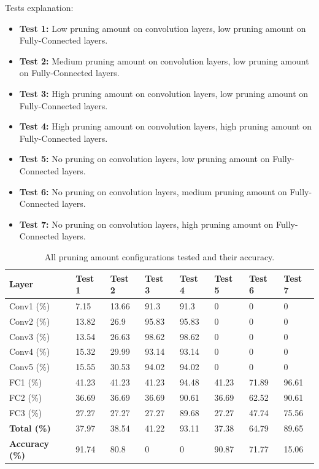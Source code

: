 Tests explanation:
\begin{itemize}
	\item \textbf{Test 1:} Low pruning amount on convolution layers, low pruning amount on Fully-Connected layers.
	\item \textbf{Test 2:} Medium pruning amount on convolution layers, low pruning amount on Fully-Connected layers.
	\item \textbf{Test 3:} High pruning amount on convolution layers, low pruning amount on Fully-Connected layers.
	\item \textbf{Test 4:} High pruning amount on convolution layers, high pruning amount on Fully-Connected layers.
	\item \textbf{Test 5:} No pruning on convolution layers, low pruning amount on Fully-Connected layers.
	\item \textbf{Test 6:} No pruning on convolution layers, medium pruning amount on Fully-Connected layers.
	\item \textbf{Test 7:} No pruning on convolution layers, high pruning amount on Fully-Connected layers.
\end{itemize}

\begin{table}[H]
	\caption{All pruning amount configurations tested and their accuracy.}
	\label{tab:pruning-amount-vs-accuracy}
	\centering
	\begin{tabular}{llll llll}
		\toprule
		\textbf{Layer} & \textbf{Test 1} & \textbf{Test 2} & \textbf{Test 3} & \textbf{Test 4} & \textbf{Test 5} & \textbf{Test 6} & \textbf{Test 7}\\
		\midrule
			Conv1 (\%) & 7.15 & 13.66 & 91.3 & 91.3 & 0 & 0 & 0 \\
			Conv2 (\%) & 13.82 & 26.9 & 95.83 & 95.83 & 0 & 0 & 0 \\
			Conv3 (\%) & 13.54 & 26.63 & 98.62 & 98.62 & 0 & 0 & 0 \\
			Conv4 (\%) & 15.32 & 29.99 & 93.14 & 93.14 & 0 & 0 & 0 \\
			Conv5 (\%) & 15.55 & 30.53 & 94.02 & 94.02 & 0 & 0 & 0 \\
			FC1 (\%) & 41.23 & 41.23 & 41.23 & 94.48 & 41.23 & 71.89 & 96.61 \\
			FC2 (\%) & 36.69 & 36.69 & 36.69 & 90.61 & 36.69 & 62.52 & 90.61 \\
			FC3 (\%) & 27.27 & 27.27 & 27.27 & 89.68 & 27.27 & 47.74 & 75.56 \\
			\midrule
			\textbf{Total (\%)} & 37.97	& 38.54 & 41.22 & 93.11 & 37.38 & 64.79 & 89.65 \\
			\midrule
			\textbf{Accuracy (\%)} & 91.74	& 80.8 & 0 & 0 & 90.87 & 71.77 & 15.06 \\
		\bottomrule
	\end{tabular}
\end{table}

